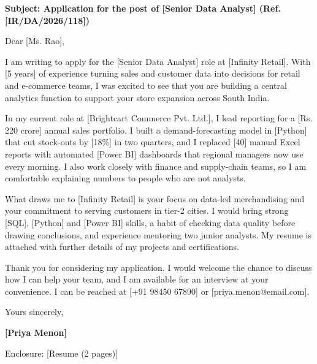 \documentclass[10pt]{article}
\begin{document}
\textbf{Subject: Application for the post of [Senior Data Analyst] (Ref. [IR/DA/2026/118])}\par\vspace{4pt}

Dear [Ms. Rao],\par\vspace{4pt}

I am writing to apply for the [Senior Data Analyst] role at [Infinity Retail]. With [5 years] of experience turning sales and customer data into decisions for retail and e-commerce teams, I was excited to see that you are building a central analytics function to support your store expansion across South India.\par\vspace{4pt}

In my current role at [Brightcart Commerce Pvt. Ltd.], I lead reporting for a [Rs.\,220 crore] annual sales portfolio. I built a demand-forecasting model in [Python] that cut stock-outs by [18\%] in two quarters, and I replaced [40] manual Excel reports with automated [Power BI] dashboards that regional managers now use every morning. I also work closely with finance and supply-chain teams, so I am comfortable explaining numbers to people who are not analysts.\par\vspace{4pt}

What draws me to [Infinity Retail] is your focus on data-led merchandising and your commitment to serving customers in tier-2 cities. I would bring strong [SQL], [Python] and [Power BI] skills, a habit of checking data quality before drawing conclusions, and experience mentoring two junior analysts. My resume is attached with further details of my projects and certifications.\par\vspace{4pt}

Thank you for considering my application. I would welcome the chance to discuss how I can help your team, and I am available for an interview at your convenience. I can be reached at [+91 98450 67890] or [priya.menon@email.com].\par\vspace{4pt}

Yours sincerely,\par\vspace{4pt}

\par\vspace{4pt}

\par\vspace{4pt}

\textbf{[Priya Menon]}\par\vspace{4pt}

Enclosure: [Resume (2 pages)]\par\vspace{4pt}
\end{document}
